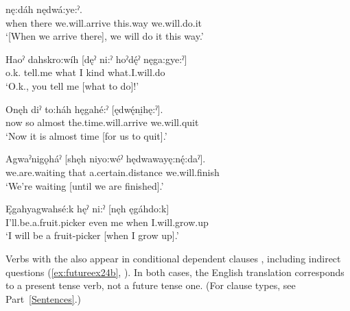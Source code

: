 \ex
{} nę:dáh nędwá:ye:ˀ. \\
when there we.will.arrive this.way we.will.do.it \\
\glt ‘[When we arrive there], we will do it this way.’

\ex
\gll Haoˀ dahskro:wíh [dęˀ ni:ˀ hoˀdę́ˀ nęga:gye:ˀ] \\
o.k. tell.me what I kind what.I.will.do\\
\glt ‘O.k., you tell me [what to do]!’ 

\ex
\gll Onęh diˀ to:háh hęgahé:ˀ [ędwę́ni̱hę:ˀ]. \\
now so almost the.time.will.arrive we.will.quit\\
\glt ‘Now it is almost time [for us to quit].’

\ex
\gll Agwaˀnigǫháˀ [shęh niyo:wéˀ hędwawayę:nę́:daˀ]. \\
we.are.waiting that a.certain.distance we.will.finish\\
\glt ‘We’re waiting [until we are finished].’

\ex
\gll Ęgahyagwahsé:k hęˀ ni:ˀ [nęh ęgáhdo:k] \\
I’ll.be.a.fruit.picker even me when I.will.grow.up\\
\glt ‘I will be a fruit-picker [when I grow up].’ 
\z
\z


Verbs with the  {\future} also appear in conditional dependent clauses , including indirect questions (\ref{ex:futureex24b}, ). In both cases, the English translation corresponds to a present tense verb, not a future tense one. (For clause types, see Part~\ref{Sentences}.)


